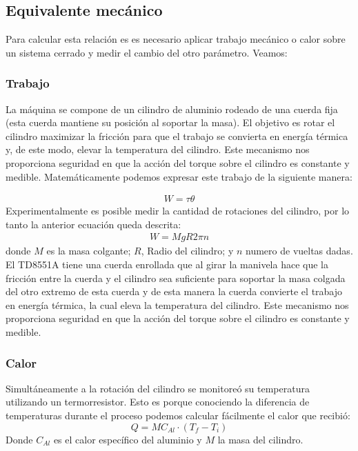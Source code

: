 \documentclass{article}
\begin{document}
\subsection{Equivalente mecánico}
Para calcular esta relación es es necesario aplicar trabajo mecánico o calor sobre un sistema cerrado y medir el cambio del otro parámetro. Veamos:

\subsubsection{Trabajo}
La máquina se compone de un cilindro de aluminio rodeado de una cuerda fija (esta cuerda mantiene su posición al soportar la masa). El objetivo es rotar el cilindro maximizar la fricción para que el trabajo se convierta en energía térmica y, de este modo, elevar la temperatura del cilindro. Este mecanismo nos proporciona seguridad en que la acción del torque sobre el cilindro es constante y medible. Matemáticamente podemos expresar este trabajo de la siguiente manera: 

\begin{align}
    W = \tau \theta
\end{align}
Experimentalmente es posible medir la cantidad de rotaciones del cilindro, por lo tanto la anterior ecuación queda descrita: 
\begin{align}
    W = MgR2\pi n
    \label{eq:mecw}
\end{align}
donde $M$ es la masa colgante; $R$, Radio del cilindro; y $n$ numero de vueltas dadas.\\

El  TD8551A tiene una cuerda enrollada que al girar la manivela hace que la fricción entre la cuerda y el cilindro sea suficiente para soportar la masa colgada del otro extremo de esta cuerda y de esta manera la cuerda convierte el trabajo en energía térmica, la cual eleva la temperatura del cilindro. Este mecanismo nos proporciona seguridad en que la acción del torque sobre el cilindro es constante y medible.

\subsubsection{Calor}
Simultáneamente a la rotación del cilindro se monitoreó su temperatura utilizando un termorresistor. Esto es porque conociendo la diferencia de temperaturas durante el proceso podemos calcular fácilmente el calor que recibió:
\begin{equation}
    Q = M C_{Al} \cdot (T_f-T_i)
    \label{eq:mecq}
\end{equation}
Donde $C_{Al}$ es el calor específico del aluminio y $M$ la masa del cilindro.\cite{pasco}
\end{document}
